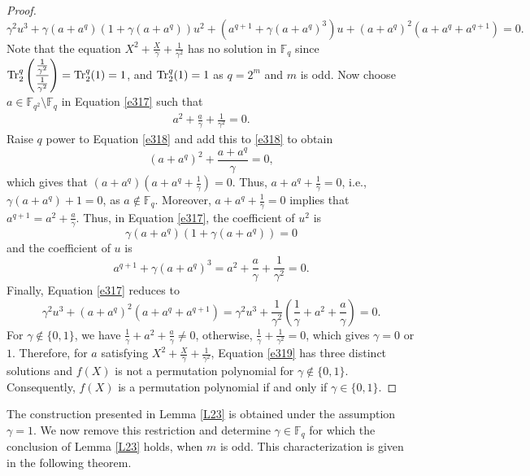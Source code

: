 \documentclass[11pt]{amsart}
\theoremstyle{plain}
\numberwithin{equation}{section}
\theoremstyle{definition}
\newcommand{\F}{\mathbb F}
\def\Tr{{\rm Tr}}
\begin{document}
\begin{proof}
\begin{equation}
\gamma^2 u^3+\gamma(a+a^q)(1+\gamma(a+a^q))u^2+\left(a^{q+1}+\gamma(a+a^{q})^3\right)u+(a+a^q)^2(a+a^q+a^{q+1})=0. 
\end{equation}
Note that the equation 
\(
X^2+\frac{X}{\gamma}+\frac{1}{\gamma^2}
\)
has no solution in $\F_q$ since $\Tr_{2}^{q}\left(\dfrac{\frac{1}{\gamma^2}}{\frac{1}{\gamma^2}}\right)=\Tr_{2}^{q}(1)=1$, and $\Tr_{2}^{q}(1)=1$ as $q=2^m$ and $m$ is odd. Now choose $a \in \F_{q^2}\setminus \F_q$ in Equation \eqref{e317} such that 
\begin{equation}\label{e318}
\begin{split}
a^2+\frac{a}{\gamma}+\frac{1}{\gamma^2}=0.
\end{split}
\end{equation}
Raise $q$ power to Equation \eqref{e318} and add this to  \eqref{e318} to obtain
\[
(a+a^q)^{2}+\frac{a+a^q}{\gamma}=0, 
\]
which gives that $\left(a+a^q\right)\left(a+a^q+\frac{1}{\gamma}\right)=0$. Thus, $a+a^q+\frac{1}{\gamma}=0$, i.e., $\gamma(a+a^q)+1=0$, as $a \not \in \F_q$. Moreover, $a+a^q+\frac{1}{\gamma}=0$ implies that $a^{q+1}=a^{2}+\frac{a}{\gamma}$. Thus, in Equation \eqref{e317}, the coefficient of $u^2$ is 
\[
\gamma(a+a^q)(1+\gamma(a+a^q))=0
\]
and the coefficient of $u$ is 
\[
a^{q+1}+\gamma(a+a^{q})^3=a^{2}+\frac{a}{\gamma}+\frac{1}{\gamma^2}=0.
\]
Finally, Equation \eqref{e317} reduces to 
\begin{equation}\label{e319}
\gamma^2 u^3+(a+a^q)^2\left(a+a^q+a^{q+1}\right)=\gamma^2 u^3+\frac{1}{\gamma^2}\left(\frac{1}{\gamma}+a^2+\frac{a}{\gamma}\right)=0.
\end{equation}
For $\gamma \not \in \{0,1\}$,  we have $\frac{1}{\gamma}+a^2+\frac{a}{\gamma} \neq 0$, otherwise, $\frac{1}{\gamma}+\frac{1}{\gamma^2}=0$, which gives $\gamma=0$ or $1$. Therefore, for $a$ satisfying $
X^2+\frac{X}{\gamma}+\frac{1}{\gamma^2}$, Equation \eqref{e319} has three distinct solutions and $f(X)$ is not a permutation polynomial for $\gamma \not \in \{0,1\}$. Consequently, $f(X)$ is a permutation polynomial if and only if $\gamma \in \{0,1\}$.
\end{proof}

The construction presented in Lemma \ref{L23} is obtained under the assumption $\gamma=1$. We now remove this restriction and determine $\gamma \in \F_q$ for which the conclusion of Lemma \ref{L23} holds, when $m$ is odd. This characterization is given in the following theorem.
\end{document}
